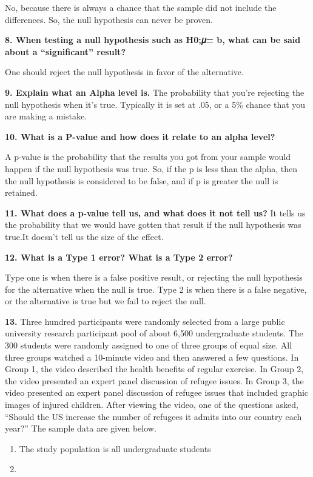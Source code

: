 \documentclass[
]{article}
\begin{document}
No, because there is always a chance that the sample did not include the
differences. So, the null hypothesis can never be proven.

\textbf{8. When testing a null hypothesis such as H0;𝜇= b, what can be
said about a ``significant'' result?}

One should reject the null hypothesis in favor of the alternative.

\textbf{9. Explain what an Alpha level is.} The probability that you're
rejecting the null hypothesis when it's true. Typically it is set at
.05, or a 5\% chance that you are making a mistake.

\textbf{10. What is a P-value and how does it relate to an alpha level?}

A p-value is the probability that the results you got from your sample
would happen if the null hypothesis was true. So, if the p is less than
the alpha, then the null hypothesis is considered to be false, and if p
is greater the null is retained.

\textbf{11. What does a p-value tell us, and what does it not tell us?}
It tells us the probability that we would have gotten that result if the
null hypothesis was true.It doesn't tell us the size of the effect.

\textbf{12. What is a Type 1 error? What is a Type 2 error?}

Type one is when there is a false positive result, or rejecting the null
hypothesis for the alternative when the null is true. Type 2 is when
there is a false negative, or the alternative is true but we fail to
reject the null.

\textbf{13.} Three hundred participants were randomly selected from a
large public university research participant pool of about 6,500
undergraduate students. The 300 students were randomly assigned to one
of three groups of equal size. All three groups watched a 10-minute
video and then answered a few questions. In Group 1, the video described
the health benefits of regular exercise. In Group 2, the video presented
an expert panel discussion of refugee issues. In Group 3, the video
presented an expert panel discussion of refugee issues that included
graphic images of injured children. After viewing the video, one of the
questions asked, ``Should the US increase the number of refugees it
admits into our country each year?'' The sample data are given below.

\begin{enumerate}
\def\labelenumi{\alph{enumi})}
\item
  The study population is all undergraduate students
\item
\end{enumerate}
\end{document}

